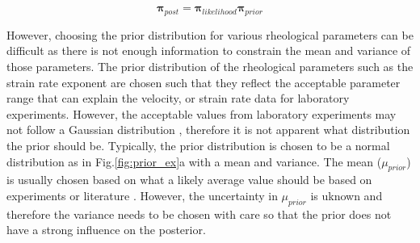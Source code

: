 \documentclass[12pt]{article}
\newcommand{\ppi}{{\ensuremath{\boldsymbol{\pi}}}}
\begin{document}
\begin{equation}
\ppi_{post} = \ppi_{likelihood}\ppi_{prior}
\label{eq:bayes}
\end{equation}

However, choosing the prior distribution for various rheological parameters can be difficult as there is not enough information to constrain the mean and variance of those parameters. The prior distribution of the rheological parameters such as the strain rate exponent are chosen such that they reflect the acceptable parameter range that can explain the velocity, or strain rate data for laboratory experiments. However, the acceptable values from laboratory experiments may not follow a Gaussian distribution \citep{korenaga2008new}, therefore it is not apparent what distribution the prior should be.  Typically, the prior distribution is chosen to be a normal distribution as in Fig.\ref{fig:prior_ex}a 
 with a mean and variance. The mean ($\mu_{prior}$) is usually chosen based on what a likely average value should be based on experiments or literature \citep{korenaga2008new}. However, the uncertainty in $\mu_{prior}$ is uknown and therefore the variance needs to be chosen with care so that the prior does not have a strong influence on the posterior.    %
\end{document}
